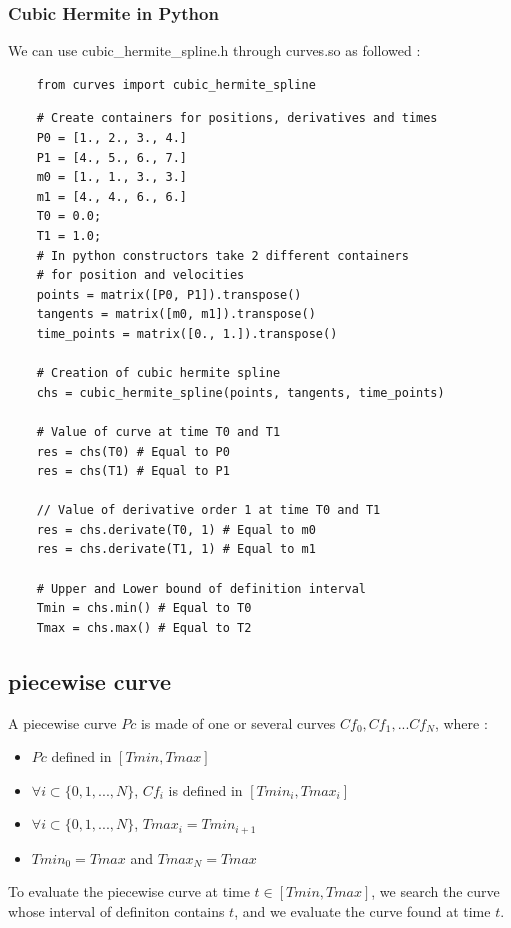 \documentclass{article}
\begin{document}
    \subsubsection{Cubic Hermite in Python}
    
    We can use cubic\_hermite\_spline.h through curves.so as followed :
    
    \begin{lstlisting}
    from curves import cubic_hermite_spline
    \end{lstlisting}
    \begin{lstlisting}
    # Create containers for positions, derivatives and times
    P0 = [1., 2., 3., 4.]
    P1 = [4., 5., 6., 7.]
    m0 = [1., 1., 3., 3.]
    m1 = [4., 4., 6., 6.]
    T0 = 0.0;
    T1 = 1.0;
    # In python constructors take 2 different containers
    # for position and velocities
    points = matrix([P0, P1]).transpose()
    tangents = matrix([m0, m1]).transpose()
    time_points = matrix([0., 1.]).transpose()
    
    # Creation of cubic hermite spline
    chs = cubic_hermite_spline(points, tangents, time_points)
    
    # Value of curve at time T0 and T1
    res = chs(T0) # Equal to P0
    res = chs(T1) # Equal to P1
    
    // Value of derivative order 1 at time T0 and T1
    res = chs.derivate(T0, 1) # Equal to m0
    res = chs.derivate(T1, 1) # Equal to m1
    
    # Upper and Lower bound of definition interval
    Tmin = chs.min() # Equal to T0
    Tmax = chs.max() # Equal to T2
    \end{lstlisting}
    
\subsection{piecewise curve}
    
    A piecewise curve $Pc$ is made of one or several curves $Cf_0, Cf_1,...Cf_N$, where :
    \begin{itemize}
        \item $Pc$ defined in $[Tmin, Tmax]$
        \item $\forall i \subset \{0,1,...,N\}$, $Cf_i$ is defined in $[Tmin_i, Tmax_i]$
        \item $\forall i \subset \{0,1,...,N\}$, $Tmax_i = Tmin_{i+1}$
        \item $Tmin_0=Tmax$ and $Tmax_N=Tmax$
    \end{itemize}
    To evaluate the piecewise curve at time $t \in [Tmin, Tmax]$, we search the curve whose interval of definiton contains $t$, and we evaluate the curve found at time $t$.
\end{document}
